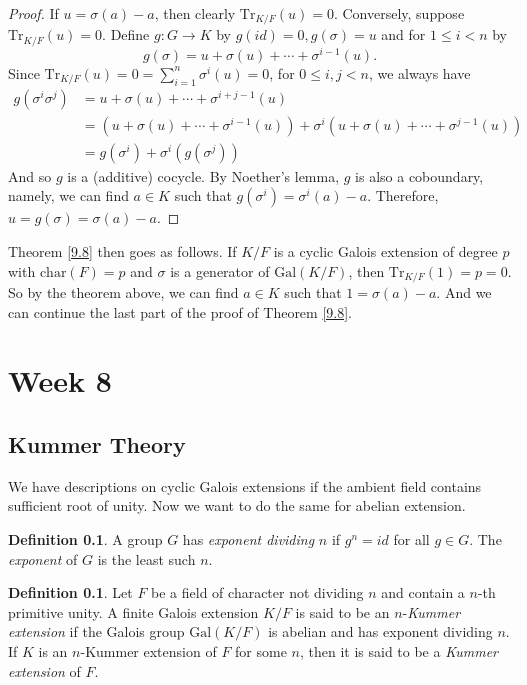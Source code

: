 \documentclass[12pt]{report}
\theoremstyle{definition}
\newtheorem{definition}[theorem]{Definition}
\newcommand{\gal}{\text{Gal}}
\newcommand{\charr}{\text{char}}
\newcommand{\Gal}{\text{Gal}}
\newcommand{\Tr}{\text{Tr}}
\begin{document}
\begin{proof}
	If $u=\sigma(a)-a$, then clearly $\Tr_{K/F}(u)=0$. Conversely, suppose $\Tr_{K/F}(u)=0$. Define $g: G\to K$ by $g(id)=0,g(\sigma)=u$ and for $1\leq i<n $ by $$g(\sigma)=u+\sigma(u)+\cdots+\sigma^{i-1}(u).$$
	Since $\Tr_{K/F}(u)=0=\sum_{i=1}^n\sigma^i(u)=0$, for $0\leq i,j<n$, we always have
	\begin{align*}
		g(\sigma^i\sigma^j) & =u+\sigma(u)+\cdots+\sigma^{i+j-1}(u)                                               \\
		                    & = (u+\sigma(u)+\cdots+\sigma^{i-1}(u))+\sigma^i(u+\sigma(u)+\cdots+\sigma^{j-1}(u)) \\
		                    & =g(\sigma^i)+\sigma^i(g(\sigma^j))
	\end{align*}
	And so $g$ is a (additive) cocycle. By Noether's lemma, $g$ is also a coboundary, namely, we can find $a\in K$ such that $g(\sigma^i)=\sigma^i(a)-a$. Therefore, $u=g(\sigma)=\sigma(a)-a$.
\end{proof}

Theorem \ref{9.8} then goes as follows. If $K/F$ is a cyclic Galois extension of degree $p$ with $\charr(F)=p$ and $\sigma$ is a generator of $\Gal(K/F)$, then $\Tr_{K/F}(1)=p=0$. So by the theorem above, we can find $a\in K$ such that $1=\sigma(a)-a$. And we can continue the last part of the proof of Theorem \ref{9.8}.


\chapter*{Week 8}
\setcounter{chapter}{8}

\section{Kummer Theory}
We have descriptions on cyclic Galois extensions if the ambient field contains sufficient root of unity. Now we want to do the same for abelian extension.

\begin{definition}
	A group $G$ has \emph{exponent dividing} $n$ if $g^n=id$ for all $g\in G$. The \emph{exponent} of $G$ is the least such $n$.
\end{definition}

\begin{definition}
	Let $F$ be a field of character not dividing $n$ and contain a $n$-th primitive unity. A finite Galois extension $K/F$ is said to be an $n$-\emph{Kummer extension} if the Galois group $\gal(K/F)$ is abelian and has exponent dividing $n$. If $K$ is an $n$-Kummer extension of $F$ for some $n$, then it is said to be a \emph{Kummer extension} of $F$.
\end{definition}
\end{document}
